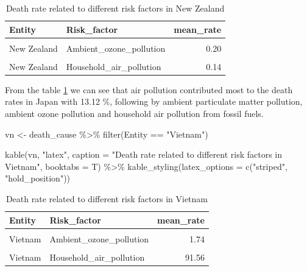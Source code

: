 \documentclass[11pt,a4paper,]{article}
\newenvironment{Shaded}{\begin{snugshade}}{\end{snugshade}}
\newcommand{\AttributeTok}[1]{\textcolor[rgb]{0.77,0.63,0.00}{#1}}
\newcommand{\FunctionTok}[1]{\textcolor[rgb]{0.00,0.00,0.00}{#1}}
\newcommand{\NormalTok}[1]{#1}
\newcommand{\OtherTok}[1]{\textcolor[rgb]{0.56,0.35,0.01}{#1}}
\newcommand{\SpecialCharTok}[1]{\textcolor[rgb]{0.00,0.00,0.00}{#1}}
\newcommand{\StringTok}[1]{\textcolor[rgb]{0.31,0.60,0.02}{#1}}
\begin{document}
\begin{table}[!h]

\caption{\label{tab:jp}Death rate related to different risk factors in New Zealand}
\centering
\begin{tabular}[t]{llr}
\toprule
Entity & Risk\_factor & mean\_rate\\
\midrule
\cellcolor{gray!6}{New Zealand} & \cellcolor{gray!6}{Air\_pollution} & \cellcolor{gray!6}{7.11}\\
New Zealand & Ambient\_ozone\_pollution & 0.20\\
\cellcolor{gray!6}{New Zealand} & \cellcolor{gray!6}{Ambient\_particulate\_matter\_pollution} & \cellcolor{gray!6}{6.77}\\
New Zealand & Household\_air\_pollution & 0.14\\
\bottomrule
\end{tabular}
\end{table}

From the table \ref{tab:jp} we can see that air pollution contributed most to the death rates in Japan with 13.12 \%, following by ambient particulate matter pollution, ambient ozone pollution and household air pollution from fossil fuels.

\begin{Shaded}
\begin{Highlighting}[]
\NormalTok{vn }\OtherTok{\textless{}{-}}\NormalTok{ death\_cause }\SpecialCharTok{\%\textgreater{}\%}
  \FunctionTok{filter}\NormalTok{(Entity }\SpecialCharTok{==} \StringTok{"Vietnam"}\NormalTok{)}

\FunctionTok{kable}\NormalTok{(vn, }\StringTok{"latex"}\NormalTok{, }\AttributeTok{caption =} \StringTok{"Death rate related to different risk factors in Vietnam"}\NormalTok{, }\AttributeTok{booktabs =}\NormalTok{ T) }\SpecialCharTok{\%\textgreater{}\%}
  \FunctionTok{kable\_styling}\NormalTok{(}\AttributeTok{latex\_options =} \FunctionTok{c}\NormalTok{(}\StringTok{"striped"}\NormalTok{, }\StringTok{"hold\_position"}\NormalTok{))}
\end{Highlighting}
\end{Shaded}

\begin{table}[!h]

\caption{\label{tab:vn}Death rate related to different risk factors in Vietnam}
\centering
\begin{tabular}[t]{llr}
\toprule
Entity & Risk\_factor & mean\_rate\\
\midrule
\cellcolor{gray!6}{Vietnam} & \cellcolor{gray!6}{Air\_pollution} & \cellcolor{gray!6}{131.61}\\
Vietnam & Ambient\_ozone\_pollution & 1.74\\
\cellcolor{gray!6}{Vietnam} & \cellcolor{gray!6}{Ambient\_particulate\_matter\_pollution} & \cellcolor{gray!6}{38.99}\\
Vietnam & Household\_air\_pollution & 91.56\\
\bottomrule
\end{tabular}
\end{table}
\end{document}
